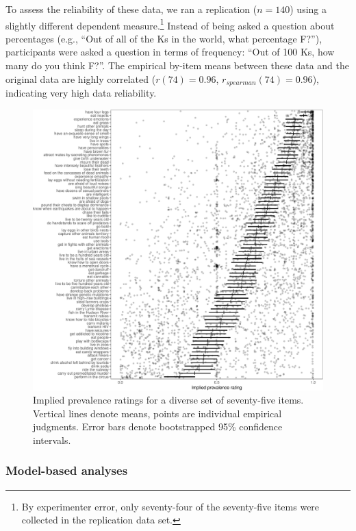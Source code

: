 \documentclass[floatsintext,doc]{apa6}
\let\rmarkdownfootnote\footnote%
\def\footnote{\protect\rmarkdownfootnote}
\newcommand{\ndg}[1]{{\textcolor{Green}{[ndg: #1]}}}
\begin{document}

To assess the reliability of these data, we ran a replication (\(n=140\)) using a slightly different dependent measure.\footnote{By experimenter error, only seventy-four of the seventy-five items were collected in the replication data set.}
Instead of being asked a question about percentages (e.g., \enquote{Out of all of the Ks in the world, what percentage F?}), participants were asked a question in terms of frequency: \enquote{Out of 100 Ks, how many do you think F?}.
The empirical by-item means between these data and the original data are highly correlated (\(r(74) = 0.96\), \(r_{spearman}(74)= 0.96\)), indicating very high data reliability.

\begin{figure}
\centering
\includegraphics{genint_files/figure-latex/genint-empiricalData-1.pdf}
\caption{\label{fig:genint-empiricalData}Implied prevalence ratings for a diverse set of seventy-five items. Vertical lines denote means, points are individual empirical judgments. Error bars denote bootstrapped 95\% confidence intervals.}
\end{figure}


\hypertarget{model-based-analyses}{%
\subsubsection{Model-based analyses}\label{model-based-analyses}}
\end{document}
